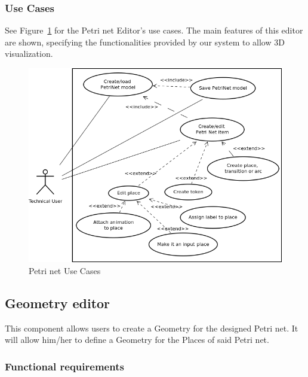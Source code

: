 \subsubsection{Use Cases}
See Figure~\ref{fig:petrinet_use_cases} for the Petri net Editor's use cases. The main features of this editor are shown, specifying the
functionalities provided by our system to allow 3D visualization.

\begin{figure}[htp]
\begin{center}
  \includegraphics[scale=0.5]{image/uc_petrinet.png}
  \caption{Petri net Use Cases}
  \label{fig:petrinet_use_cases}
\end{center}
\end{figure}

\subsection{Geometry editor}

This component allows users to create a Geometry for the designed Petri net. It will allow him/her to define a 
Geometry for the Places of said Petri net.

\subsubsection{Functional requirements}

